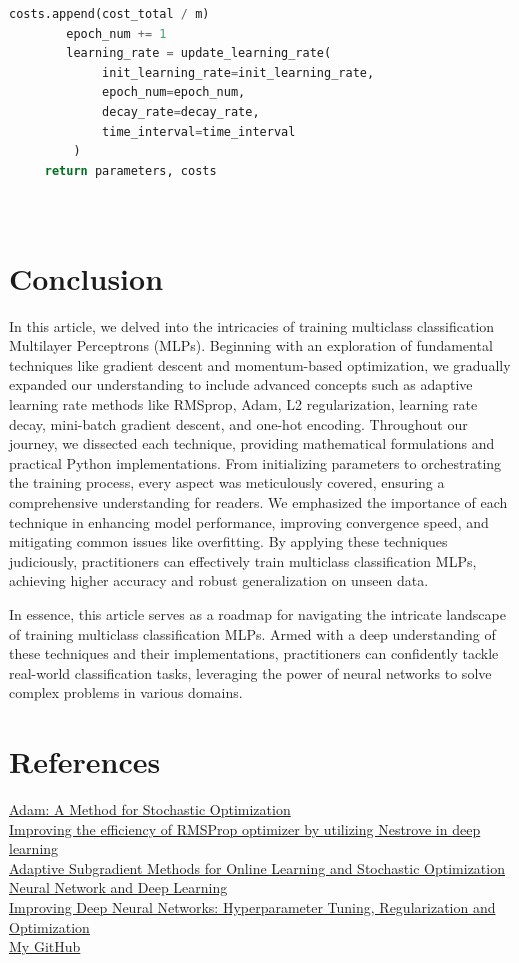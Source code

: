 \documentclass[12pt]{article}
\begin{document}
\begin{lstlisting}[language=Python, caption={Train the Model}, breaklines=true]
        costs.append(cost_total / m)
        epoch_num += 1
        learning_rate = update_learning_rate(
             init_learning_rate=init_learning_rate,
             epoch_num=epoch_num,
             decay_rate=decay_rate,
             time_interval=time_interval
         )
     return parameters, costs
                     
       
\end{lstlisting}

\section*{Conclusion}

In this article, we delved into the intricacies of training multiclass classification Multilayer Perceptrons (MLPs). Beginning with an exploration of fundamental techniques like gradient descent and momentum-based optimization, we gradually expanded our understanding to include advanced concepts such as adaptive learning rate methods like RMSprop, Adam, L2 regularization, learning rate decay, mini-batch gradient descent, and one-hot encoding. Throughout our journey, we dissected each technique, providing mathematical formulations and practical Python implementations. From initializing parameters to orchestrating the training process, every aspect was meticulously covered, ensuring a comprehensive understanding for readers. We emphasized the importance of each technique in enhancing model performance, improving convergence speed, and mitigating common issues like overfitting. By applying these techniques judiciously, practitioners can effectively train multiclass classification MLPs, achieving higher accuracy and robust generalization on unseen data.

In essence, this article serves as a roadmap for navigating the intricate landscape of training multiclass classification MLPs. Armed with a deep understanding of these techniques and their implementations, practitioners can confidently tackle real-world classification tasks, leveraging the power of neural networks to solve complex problems in various domains.

\section*{References}
\href{https://arxiv.org/abs/1412.6980}{Adam: A Method for Stochastic Optimization}\\[6px]
\href{https://www.nature.com/articles/s41598-023-35663-x}{Improving the efficiency of RMSProp optimizer by utilizing Nestrove in deep learning}\\[6px]
\href{https://www.jmlr.org/papers/volume12/duchi11a/duchi11a.pdf}{Adaptive Subgradient Methods for Online Learning and Stochastic Optimization}\\[6px]
\href{https://www.coursera.org/learn/neural-networks-deep-learning?}{Neural Network and Deep Learning}\\[6px]
\href{https://www.coursera.org/learn/deep-neural-network}{Improving Deep Neural Networks: Hyperparameter Tuning, Regularization and Optimization}\\[6px]
\href{https://github.com/LoqmanSamani/deep-learning}{My GitHub}
\end{document}
